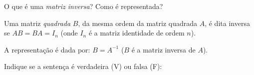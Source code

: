 \documentclass[pdftex, brazil, 12pt, oneside, addpoints]{exam}
\newcommand{\vf}[1][{}]{%
  \fillin[#1][0.25in]%
}
\begin{document}
\begin{questions}

\question
O que é uma \emph{matriz inversa}? Como é representada?
\begin{solutionorlines}[0.50in]
  Uma matriz \emph{quadrada} $B$, da mesma ordem da matriz quadrada $A$, é dita inversa
  se $AB = BA = I_n$ (onde $I_n$ é a matriz identidade de ordem $n$).

  A representação é dada por: $B = A^{-1}$ ($B$ é a matriz inversa de $A$).
\end{solutionorlines}

\question
Indique se a sentença é verdadeira (V) ou falsa (F):


\end{questions}
\end{document}
